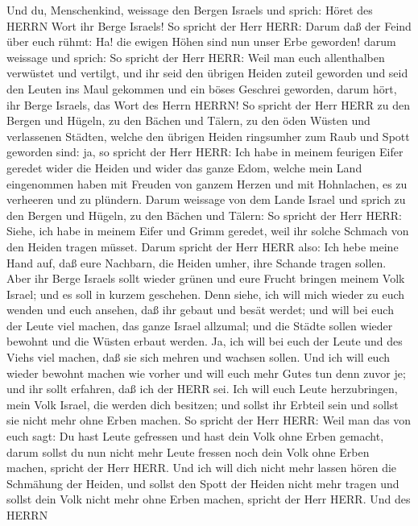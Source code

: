  Und du, Menschenkind, weissage den Bergen Israels und
sprich: Höret des HERRN Wort ihr Berge Israels!  So spricht
der Herr HERR: Darum daß der Feind über euch rühmt: Ha! die ewigen Höhen
sind nun unser Erbe geworden!  darum weissage und sprich: So
spricht der Herr HERR: Weil man euch allenthalben verwüstet und
vertilgt, und ihr seid den übrigen Heiden zuteil geworden und seid den
Leuten ins Maul gekommen und ein böses Geschrei geworden, 
darum hört, ihr Berge Israels, das Wort des Herrn HERRN! So spricht der
Herr HERR zu den Bergen und Hügeln, zu den Bächen und Tälern, zu den
öden Wüsten und verlassenen Städten, welche den übrigen Heiden
ringsumher zum Raub und Spott geworden sind:  ja, so spricht
der Herr HERR: Ich habe in meinem feurigen Eifer geredet wider die
Heiden und wider das ganze Edom, welche mein Land eingenommen haben mit
Freuden von ganzem Herzen und mit Hohnlachen, es zu verheeren und zu
plündern.  Darum weissage von dem Lande Israel und sprich zu
den Bergen und Hügeln, zu den Bächen und Tälern: So spricht der Herr
HERR: Siehe, ich habe in meinem Eifer und Grimm geredet, weil ihr solche
Schmach von den Heiden tragen müsset.  Darum spricht der
Herr HERR also: Ich hebe meine Hand auf, daß eure Nachbarn, die Heiden
umher, ihre Schande tragen sollen.  Aber ihr Berge Israels
sollt wieder grünen und eure Frucht bringen meinem Volk Israel; und es
soll in kurzem geschehen.  Denn siehe, ich will mich wieder
zu euch wenden und euch ansehen, daß ihr gebaut und besät werdet;
 und will bei euch der Leute viel machen, das ganze Israel
allzumal; und die Städte sollen wieder bewohnt und die Wüsten erbaut
werden.  Ja, ich will bei euch der Leute und des Viehs viel
machen, daß sie sich mehren und wachsen sollen. Und ich will euch wieder
bewohnt machen wie vorher und will euch mehr Gutes tun denn zuvor je;
und ihr sollt erfahren, daß ich der HERR sei.  Ich will
euch Leute herzubringen, mein Volk Israel, die werden dich besitzen; und
sollst ihr Erbteil sein und sollst sie nicht mehr ohne Erben machen.
 So spricht der Herr HERR: Weil man das von euch sagt: Du
hast Leute gefressen und hast dein Volk ohne Erben gemacht,
 darum sollst du nun nicht mehr Leute fressen noch dein
Volk ohne Erben machen, spricht der Herr HERR.  Und ich
will dich nicht mehr lassen hören die Schmähung der Heiden, und sollst
den Spott der Heiden nicht mehr tragen und sollst dein Volk nicht mehr
ohne Erben machen, spricht der Herr HERR.  Und des HERRN

